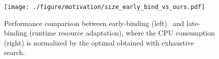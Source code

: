 \begin{figure}[t!]
\centering
\texttt{[image: ./figure/motivation/size\_early\_bind\_vs\_ours.pdf]}
\caption{Performance comparison between early-binding (left)~\cite{eurosys19-grandslam} and late-binding (runtime resource adaptation), where the CPU consumption (right) is normalized by the optimal obtained with exhaustive search.} 
\label{fig:bg:size}
\end{figure}

   
	






